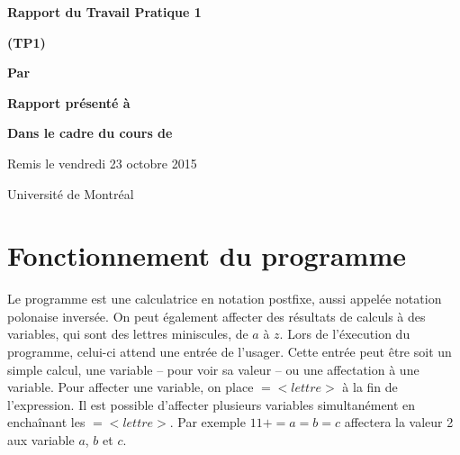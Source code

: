 \documentclass[letterpaper,12pt]{scrartcl}
\begin{document}
	\begin{center}
		\vspace{2cm}

		{\Huge\bf\sf Rapport du Travail Pratique 1}

		\vspace{0.5cm}

		{\bf\sf (TP1)}

		\vspace{4cm}

		{\bf\sf Par}

		\vspace{0.5cm}{\large\bf\sf Sulliman Aïad et François Poitras}

		\vspace{2cm}

		{\bf\sf Rapport présenté à}

		\vspace{0.5cm}{\large\bf\sf M. Marc  Feeley}

		\vspace{2cm}

		{\bf\sf Dans le cadre du cours de}

		\vspace{0.5cm}{\large\bf\sf Concepts des langages de programmation (IFT2035)}

		\vspace{\fill}
		Remis le vendredi 23 octobre 2015

		\vspace{0.5cm}Université de Montréal
	\end{center}
	
	\newpage

	\pagestyle{cb}
	
	\tableofcontents

	\newpage
	
	\section{Fonctionnement du programme}
		Le programme est une calculatrice en notation postfixe, aussi appelée notation polonaise inversée. On peut également affecter des résultats de calculs à des variables, qui sont des lettres miniscules, de $a$ à $z$. Lors de l'éxecution du programme, celui-ci attend une entrée de l'usager. Cette entrée peut être soit un simple calcul, une variable -- pour voir sa valeur -- ou une affectation à une variable. Pour affecter une variable, on place $=<lettre>$ à la fin de l'expression. Il est possible d'affecter plusieurs variables simultanément en enchaînant les $=<lettre>$. Par exemple $1 1 + =a =b =c$ affectera la valeur 2 aux variable $a$, $b$ et $c$. 
\end{document}
